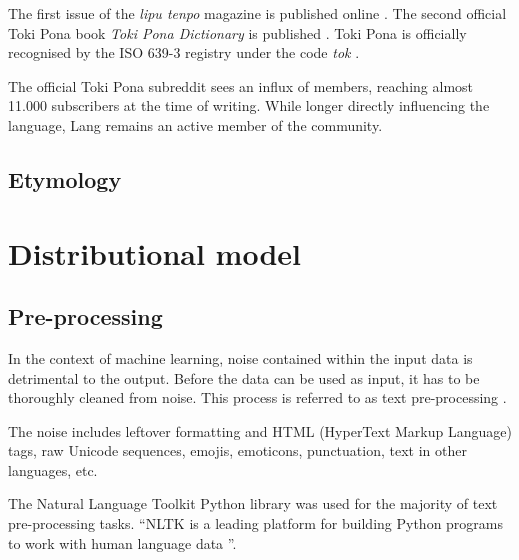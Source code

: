 \documentclass[14pt, a4paper]{extreport}
\begin{document}
The first issue of the \textit{lipu tenpo} magazine is published online \parencite{liputenpo}. The second official Toki Pona book \textit{Toki Pona Dictionary} is published \parencite{ku}. Toki Pona is officially recognised by the ISO 639-3 registry under the code \textit{tok} \parencite{isoproof}.

The official Toki Pona subreddit sees an influx of members, reaching almost 11.000 subscribers at the time of writing. While longer directly influencing the language, Lang remains an active member of the community.
      \subsection{Etymology}

  \section{Distributional model}
    \subsection{Pre-processing}
In the context of machine learning, noise contained within the input data is detrimental to the output. Before the data can be used as input, it has to be thoroughly cleaned from noise. This process is referred to as text pre-processing \parencite[49]{vajjala}.

The noise includes leftover formatting and HTML (HyperText Markup Language) tags, raw Unicode sequences, emojis, emoticons, punctuation, text in other languages, etc.

The Natural Language Toolkit Python library was used for the majority of text pre-processing tasks. ``NLTK is a leading platform for building Python programs to work with human language data \parencite{nltk}''.
\end{document}
